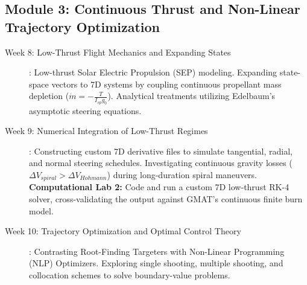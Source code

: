 \documentclass[11pt, letterpaper]{article}
\begin{document}
\subsection*{Module 3: Continuous Thrust and Non-Linear Trajectory Optimization}
\begin{description}
    \item[Week 8: Low-Thrust Flight Mechanics and Expanding States]: Low-thrust Solar Electric Propulsion (SEP) modeling. Expanding state-space vectors to 7D systems by coupling continuous propellant mass depletion ($\dot{m} = -\frac{T}{I_{sp} g_0}$). Analytical treatments utilizing Edelbaum's asymptotic steering equations.
    
    \item[Week 9: Numerical Integration of Low-Thrust Regimes]: Constructing custom 7D derivative files to simulate tangential, radial, and normal steering schedules. Investigating continuous gravity losses ($\Delta V_{spiral} > \Delta V_{Hohmann}$) during long-duration spiral maneuvers.
    \textbf{Computational Lab 2:} Code and run a custom 7D low-thrust RK-4 solver, cross-validating the output against GMAT's continuous finite burn model.
    
    \item[Week 10: Trajectory Optimization and Optimal Control Theory]: Contrasting Root-Finding Targeters with Non-Linear Programming (NLP) Optimizers. Exploring single shooting, multiple shooting, and collocation schemes to solve boundary-value problems.
\end{description}
\end{document}
